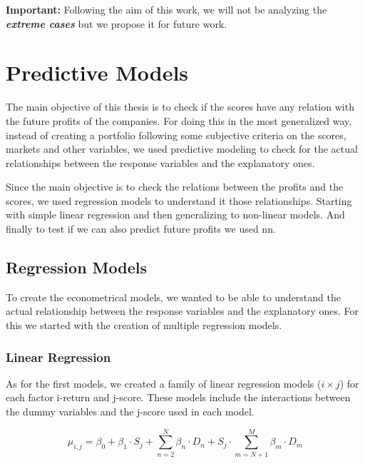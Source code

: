 \documentclass[11pt,english,a4paper,hidelinks]{book}
\begin{document}
\vspace{0.5cm}
\noindent \textbf{Important:} Following the aim of this work, we will not be analyzing the \textbf{\textit{extreme cases}} but we propose it for future work.


\section{Predictive Models}
The main objective of this thesis is to check if the scores have any relation with the future profits of the companies. For doing this in the most generalized way, instead of creating a portfolio following some subjective criteria on the scores, markets and other variables, we used predictive modeling to check for the actual relationships between the response variables and the explanatory ones.

\vspace{0.5cm}
\noindent Since the main objective is to check the relations between the profits and the scores, we used regression models to understand it those relationships. Starting with simple linear regression and then generalizing to non-linear models. And finally to test if we can also predict future profits we used \gls{nn}.


\subsection{Regression Models}

To create the econometrical models, we wanted to be able to understand the actual relationship between the response variables and the explanatory ones. For this we started with the creation of multiple regression models.

\subsubsection{Linear Regression}

As for the first models, we created a family of linear regression models (\(i \times j\)) for each factor i-return and j-score. These models include the interactions between the dummy variables and the j-score used in each model.

\begin{equation}
    \mu_{i,j} = \beta_0+\beta_1 \cdot S_j + 
\sum_{n=2}^{N}\beta_{n}\cdot D_n + S_j \cdot \sum_{m=N+1}^{M}\beta_{m}\cdot D_m
\end{equation}
\end{document}
